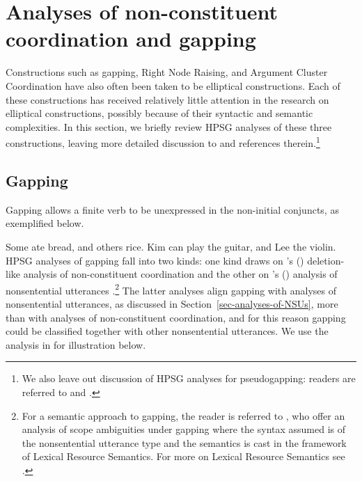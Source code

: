 \section{Analyses of non-constituent coordination and gapping}
\label{sec-analyses-of-noncon}\label{ellipsis:sec-analyses-of-noncon}

Constructions such as gapping, Right Node Raising, and Argument Cluster Coordination have also often been taken to be elliptical
constructions. Each of these constructions has received relatively little attention in the research
on elliptical constructions, possibly because of their syntactic and semantic complexities. In this
section, we briefly review HPSG analyses of these three constructions, leaving more detailed
discussion to  and references therein.\footnote{We also leave out
  discussion of HPSG analyses for pseudogapping: readers are referred to  and .}


\subsection{Gapping}
\label{ellipsis:sec-gapping}

Gapping %
allows a finite
verb to be unexpressed in the non-initial conjuncts, as exemplified below. %

\eal
\label{ex-gapping}
\ex Some ate bread, and others rice.\label{g1}
\ex Kim can play the guitar, and Lee the violin.\label{g2}
\zl
%
%
%
%
HPSG analyses of gapping fall into two kinds: one kind draws on \citeauthor{Beavers2004}'s (\citeyear{Beavers2004}) deletion-like analysis of non-constituent coordination \citep{Chaves2009} and the other on \citeauthor{Ginzburg:Sag:2000}'s (\citeyear{Ginzburg:Sag:2000}) analysis of nonsentential utterances \citep{Abeille2014}.\footnote{For a semantic approach to gapping, the reader is referred to \citet{Parketal2019}, who offer an analysis of scope ambiguities under gapping where the syntax assumed is of the nonsentential utterance  type and the semantics is cast in the framework of Lexical Resource Semantics. For more on Lexical Resource Semantics see .} The latter analyses align gapping with analyses of nonsentential utterances, as discussed in Section~\ref{sec-analyses-of-NSUs}, more than with analyses of non-constituent coordination, and for this reason gapping could be classified together with other nonsentential utterances. We use the analysis in \citet{Abeille2014} for illustration below.

